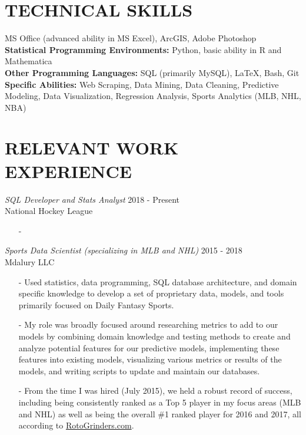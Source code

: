 \documentclass[margin]{res}
\begin{document}
\begin{resume}
\section{TECHNICAL SKILLS} 
\textbullet\hspace{3pt} MS Office (advanced ability in MS Excel), ArcGIS, Adobe Photoshop %
\\\textbullet\hspace{3pt} \textbf{Statistical Programming Environments:} Python, basic ability in R and Mathematica
\\\textbullet\hspace{3pt} \textbf{Other Programming Languages:} SQL (primarily MySQL), \LaTeX, Bash, Git %
\\\textbullet \hspace{3pt} \textbf{Specific Abilities:} Web Scraping, Data Mining, Data Cleaning, Predictive Modeling, Data Visualization, Regression Analysis, Sports Analytics (MLB, NHL, NBA)

\section{RELEVANT WORK EXPERIENCE}
\textit{SQL Developer and Stats Analyst} \hfill 2018 - Present
\\National Hockey League
\begin{itemize}
\item[-]
\end{itemize}

\textit{Sports Data Scientist (specializing in MLB and NHL)} \hfill 2015 - 2018
\\Mdalury LLC
\begin{itemize}
\item[-] Used statistics, data programming, SQL database architecture, and domain specific knowledge to develop a set of proprietary data, models, and tools primarily focused on Daily Fantasy Sports.
\item[-] My role was broadly focused around researching metrics to add to our models by combining domain knowledge and testing methods to create and analyze potential features for our predictive models, implementing these features into existing models, visualizing various metrics or results of the models, and writing scripts to update and maintain our databases.
\item[-] From the time I was hired (July 2015), we held a robust record of success, including being consistently ranked as a Top 5 player in my focus areas (MLB and NHL) as well as being the overall \#1 ranked player for 2016 and 2017, all according to \href{https://rotogrinders.com/profiles/saahilsud}{RotoGrinders.com}.
\end{itemize}


\end{resume}
\end{document}
